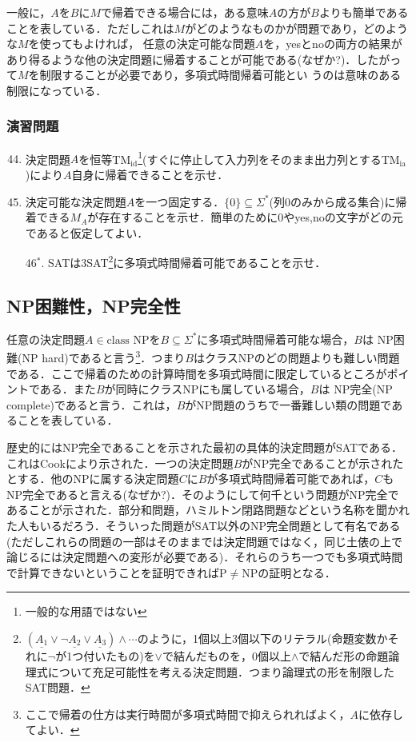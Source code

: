 \documentclass{ltjsarticle}
\theoremstyle{mystyle1}
\theoremstyle{mystyle3}
\theoremstyle{mystyle2}
\newcommand{\red}[1]{{\color{red} #1}}
\begin{document}
一般に，$A$を$B$に$M$で帰着できる場合には，ある意味$A$の方が$B$よりも簡単であることを表している．ただしこれは$M$がどのようなものかが問題であり，どのような$M$を使ってもよければ， 任意の決定可能な問題$A$を，yesとnoの両方の結果があり得るような他の決定問題に帰着することが可能である(なぜか?)．したがって$M$を制限することが必要であり，多項式時間帰着可能とい うのは意味のある制限になっている．
\subsubsection*{演習問題}
\begin{enumerate}
  \setcounter{enumi}{43}
  \item 決定問題$A$を恒等TM$_\text{id}$\footnote{一般的な用語ではない}(すぐに停止して入力列をそのまま出力列とするTM$_\text{ia}$)により$A$自身に帰着できることを示せ．
  \item 決定可能な決定問題$A$を一つ固定する．$\{0\}\subseteq\Sigma^\ast$(列0のみから成る集合)に帰着できる$M_A$が存在することを示せ．簡単のために0やyes,noの文字がどの元であると仮定してよい．
  \item[46$^\ast$.] SATは3SAT\footnote{$\left(\underline{A_1}\vee\neg\underline{A_2}\vee\underline{A_3}\right)\wedge\cdots$のように，1個以上3個以下のリテラル(命題変数かそれに$\neg$が1つ付いたもの)を$\vee$で結んだものを，0個以上$\wedge$で結んだ形の命題論理式について充足可能性を考える決定問題．つまり論理式の形を制限したSAT問題．}に多項式時間帰着可能であることを示せ．
\end{enumerate}
\subsection{NP困難性，NP完全性}
任意の決定問題$A\in\text{class NP}$を$B\subseteq\Sigma^\ast$に多項式時間帰着可能な場合，$B$は\red{NP困難}(NP hard)であると言う\footnote{ここで帰着の仕方は実行時間が多項式時間で抑えられればよく，$A$に依存してよい．}．つまり$B$はクラスNPのどの問題よりも難しい問題である．ここで帰着のための計算時間を多項式時間に限定しているところがポイントである．また$B$が同時にクラスNPにも属している場合，$B$は\red{NP完全}(NP complete)であると言う．これは，$B$がNP問題のうちで一番難しい類の問題であることを表している．

歴史的にはNP完全であることを示された最初の具体的決定問題がSATである．これはCookにより示された．一つの決定問題$B$がNP完全であることが示されたとする．他のNPに属する決定問題$C$に$B$が多項式時間帰着可能であれば，$C$もNP完全であると言える(なぜか?)．そのようにして何千という問題がNP完全であることが示された．部分和問題，ハミルトン閉路問題などという名称を聞かれた人もいるだろう．そういった問題がSAT以外のNP完全問題として有名である(ただしこれらの問題の一部はそのままでは決定問題ではなく，同じ土俵の上で論じるには決定問題への変形が必要である)．それらのうち一つでも多項式時間で計算できないということを証明できればP$\neq$NPの証明となる．
\end{document}
